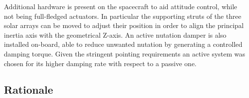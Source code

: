 Additional hardware is present on the spacecraft to aid attitude control, while not being full-fledged actuators. In particular the supporting struts of the three solar arrays can be moved to adjust their position in order to align the principal inertia axis with the geometrical Z-axis. \cite{LL_early_cruise} An active nutation damper is also installed on-board, able to reduce unwanted nutation by generating a controlled damping torque. \cite{juno_sito} Given the stringent pointing requirements an active system was chosen for its higher damping rate with respect to a passive one.   

\subsection{Rationale}
\label{subsec:Rationale}

